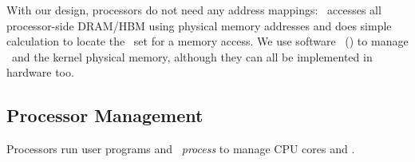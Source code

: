 \documentclass[10pt,times,twocolumn]{z2-article}
\begin{document}
{{{{{{{With our design, processors do not need any address mappings:
\lego\ accesses all processor-side DRAM/HBM using physical memory addresses
and does simple calculation to locate the \excache\ set for a memory access.
We use software~\cite{softvm-HPCA97,Tsai-ISCA17} (\lego) to manage \excache\ and the kernel physical memory,
although they can all be implemented in hardware too.

\subsection{Processor Management}
Processors run user programs and \lego\ {\em process \microos{}}
to manage CPU cores and \excache. 




}}}}}}}
\end{document}
